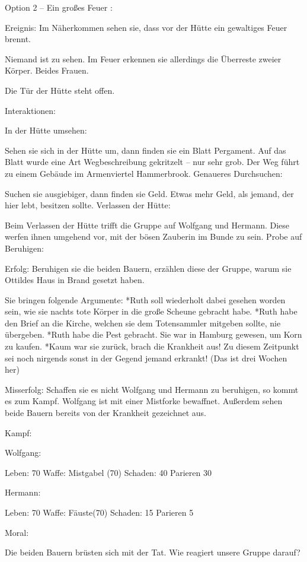 Option 2 – Ein großes Feuer
:

Ereignis: Im Näherkommen sehen sie, dass vor der Hütte ein gewaltiges Feuer brennt.

Niemand ist zu sehen. Im Feuer erkennen sie allerdings die Überreste zweier Körper. Beides Frauen.

Die Tür der Hütte steht offen.

Interaktionen:

In der Hütte umsehen:

Sehen sie sich in der Hütte um, dann finden sie ein Blatt Pergament. Auf das Blatt wurde eine Art Wegbeschreibung gekritzelt – nur sehr grob. Der Weg führt zu einem Gebäude im Armenviertel Hammerbrook.
Genaueres Durchsuchen:

Suchen sie ausgiebiger, dann finden sie Geld. Etwas mehr Geld, als jemand, der hier lebt, besitzen sollte.
Verlassen der Hütte:

Beim Verlassen der Hütte trifft die Gruppe auf Wolfgang und Hermann. Diese werfen ihnen umgehend vor, mit der bösen Zauberin im Bunde zu sein.
Probe auf Beruhigen:

Erfolg: Beruhigen sie die beiden Bauern, erzählen diese der Gruppe, warum sie Ottildes Haus in Brand gesetzt haben.

Sie bringen folgende Argumente:
*Ruth soll wiederholt dabei gesehen worden sein, wie sie nachts tote Körper in die große Scheune gebracht habe.
*Ruth habe den Brief an die Kirche, welchen sie dem Totensammler mitgeben sollte, nie übergeben.
*Ruth habe die Pest gebracht. Sie war in Hamburg gewesen, um Korn zu kaufen.
*Kaum war sie zurück, brach die Krankheit aus! Zu diesem Zeitpunkt sei noch nirgends sonst in der Gegend jemand erkrankt! (Das ist drei Wochen her)

Misserfolg: Schaffen sie es nicht Wolfgang und Hermann zu beruhigen, so kommt es zum Kampf.
Wolfgang ist mit einer Mistforke bewaffnet. Außerdem sehen beide Bauern bereits von der Krankheit gezeichnet aus.

Kampf:

Wolfgang:

Leben: 70
Waffe: Mistgabel (70)
Schaden: 40
Parieren 30

Hermann:

Leben: 70
Waffe: Fäuste(70)
Schaden: 15
Parieren 5

Moral:

Die beiden Bauern brüsten sich mit der Tat. Wie reagiert unsere Gruppe darauf?


